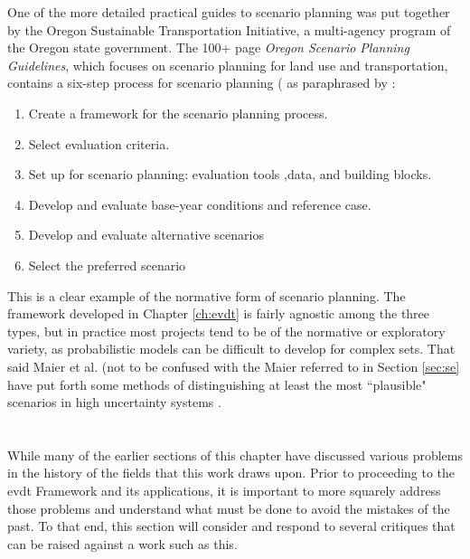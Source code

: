 One of the more detailed practical guides to scenario planning was put together by the Oregon Sustainable Transportation Initiative, a multi-agency program of the Oregon state government. The 100+ page \textit{Oregon Scenario Planning Guidelines}, which focuses on scenario planning for land use and transportation, contains a six-step process for scenario planning ( \cite{oregonsustainabletransportationinitiativeScenarioPlanningGuidelines2017} as paraphrased by \cite{goodspeedScenarioPlanningCities2020}:

\begin{enumerate}[itemsep=0pt,parsep=0pt]
	\item{Create a framework for the scenario planning process.}
	\item{Select evaluation criteria.}
	\item{Set up for scenario planning: evaluation tools ,data, and building blocks.}
	\item{Develop and evaluate base-year conditions and reference case.}
	\item{Develop and evaluate alternative scenarios}
	\item{Select the preferred scenario}
\end{enumerate}

This is a clear example of the normative form of scenario planning. The framework developed in Chapter \ref{ch:evdt} is fairly agnostic among the three types, but in practice most projects tend to be of the normative or exploratory variety, as probabilistic models can be difficult to develop for complex \acf{sets}. That said Maier et al. (not to be confused with the Maier referred to in Section \ref{sec:se} have put forth some methods of distinguishing at least the most ``plausible" scenarios in high uncertainty systems \cite{maierUncertainFutureDeep2016}.

\section{} \label{sec:critiques}

While many of the earlier sections of this chapter have discussed various problems in the history of the fields that this work draws upon. Prior to proceeding to the \ac{evdt} Framework and its applications, it is important to more squarely address those problems and understand what must be done to avoid the mistakes of the past. To that end, this section will consider and respond to several critiques that can be raised against a work such as this.

